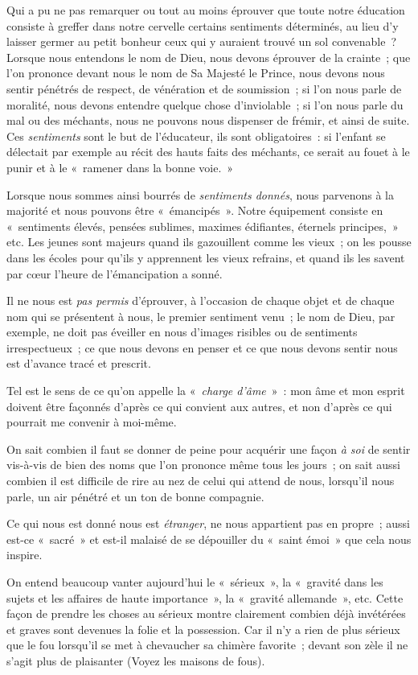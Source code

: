 \documentclass[french,twoside]{book} %
\begin{document}
Qui a pu ne pas remarquer ou tout au moins éprouver que toute notre éducation consiste à greffer dans notre cervelle certains sentiments déterminés, au lieu  d’y laisser germer au petit bonheur ceux qui y auraient trouvé un sol convenable ? Lorsque nous entendons le nom de Dieu, nous devons éprouver de la crainte ; que l’on prononce devant nous le nom de Sa Majesté le Prince, nous devons nous sentir pénétrés de respect, de vénération et de soumission ; si l’on nous parle de moralité, nous devons entendre quelque chose d’inviolable ; si l’on nous parle du mal ou des méchants, nous ne pouvons nous dispenser de frémir, et ainsi de suite. Ces \emph{sentiments} sont le but de l’éducateur, ils sont obligatoires : si l’enfant se délectait par exemple au récit des hauts faits des méchants, ce serait au fouet à le punir et à le « ramener dans la bonne voie. »\par
Lorsque nous sommes ainsi bourrés de \emph{sentiments donnés}, nous parvenons à la majorité et nous pouvons être « émancipés ». Notre équipement consiste en « sentiments élevés, pensées sublimes, maximes édifiantes, éternels principes, » etc. Les jeunes sont majeurs quand ils gazouillent comme les vieux ; on les pousse dans les écoles pour qu’ils y apprennent les vieux refrains, et quand ils les savent par cœur l’heure de l’émancipation a sonné.\par
Il ne nous est \emph{pas permis} d’éprouver, à l’occasion de chaque objet et de chaque nom qui se présentent à nous, le premier sentiment venu ; le nom de Dieu, par exemple, ne doit pas éveiller en nous d’images risibles ou de sentiments irrespectueux ; ce que nous devons en penser et ce que nous devons sentir nous est d’avance tracé et prescrit.\par
Tel est le sens de ce qu’on appelle la « \emph{charge d’âme} » : mon âme et mon esprit doivent être façonnés d’après ce qui convient aux autres, et non d’après ce qui pourrait me convenir à moi-même.\par
On sait combien il faut se donner de peine pour acquérir une façon \emph{à soi} de sentir vis-à-vis de bien des noms que l’on prononce même tous les jours ; on sait aussi combien il est difficile de rire au nez de celui  qui attend de nous, lorsqu’il nous parle, un air pénétré et un ton de bonne compagnie.\par
Ce qui nous est donné nous est \emph{étranger}, ne nous appartient pas en propre ; aussi est-ce « sacré » et est-il malaisé de se dépouiller du « saint émoi » que cela nous inspire.\par
On entend beaucoup vanter aujourd’hui le « sérieux », la « gravité dans les sujets et les affaires de haute importance », la « gravité allemande », etc. Cette façon de prendre les choses au sérieux montre clairement combien déjà invétérées et graves sont devenues la folie et la possession. Car il n’y a rien de plus sérieux que le fou lorsqu’il se met à chevaucher sa chimère favorite ; devant son zèle il ne s’agit plus de plaisanter (Voyez les maisons de fous).
\end{document}
